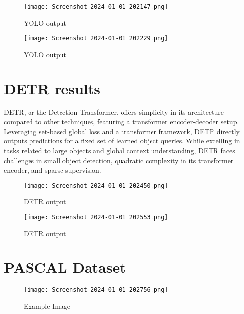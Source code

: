 \documentclass{article}
\begin{document}
\begin{figure}[H]
  \centering
  \texttt{[image: Screenshot 2024-01-01 202147.png]} %
  \caption{YOLO output}
  \label{fig:example}
\end{figure}


\begin{figure}[H]
  \centering
  \texttt{[image: Screenshot 2024-01-01 202229.png]} %
  \caption{YOLO output}
  \label{fig:example}
\end{figure}

\section{DETR results}


DETR, or the Detection Transformer, offers simplicity in its architecture compared to other techniques, featuring a transformer encoder-decoder setup. Leveraging set-based global loss and a transformer framework, DETR directly outputs predictions for a fixed set of learned object queries. While excelling in tasks related to large objects and global context understanding, DETR faces challenges in small object detection, quadratic complexity in its transformer encoder, and sparse supervision.

\begin{figure}[H]
  \centering
  \texttt{[image: Screenshot 2024-01-01 202450.png]} %
  \caption{DETR output}
  \label{fig:example}
\end{figure}

\begin{figure}[H]
  \centering
  \texttt{[image: Screenshot 2024-01-01 202553.png]} %
  \caption{DETR output}
  \label{fig:example}
\end{figure}

\section{PASCAL Dataset}

\begin{figure}[H]
  \centering
  \texttt{[image: Screenshot 2024-01-01 202756.png]} %
  \caption{Example Image}
  \label{fig:example}
\end{figure}
\end{document}
